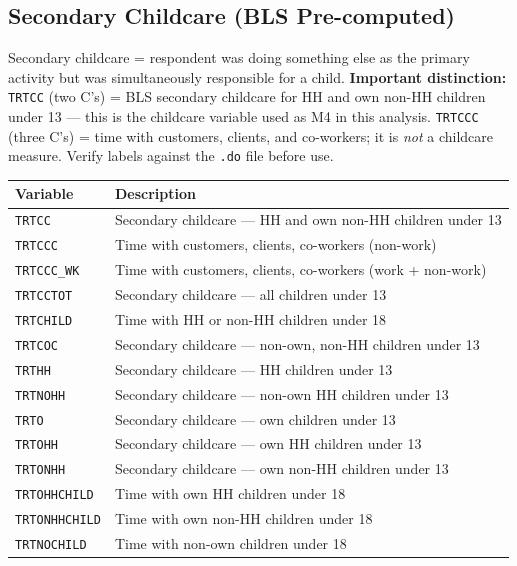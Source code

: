 \documentclass[11pt, a4paper]{article}
\begin{document}
\subsection{Secondary Childcare (BLS Pre-computed)}

\begin{tcolorbox}[notebox]
\small Secondary childcare = respondent was doing something else as the primary
activity but was simultaneously responsible for a child.
\textbf{Important distinction:} \texttt{TRTCC} (two C's) = BLS secondary
childcare for HH and own non-HH children under 13 --- this is the childcare
variable used as M4 in this analysis.
\texttt{TRTCCC} (three C's) = time with customers, clients, and co-workers;
it is \emph{not} a childcare measure. Verify labels against the
\texttt{.do} file before use.
\end{tcolorbox}

\vspace{1mm}
\begin{longtable}{L{3.8cm} L{12cm}}
\toprule \textbf{Variable} & \textbf{Description} \\ \midrule \endhead
\bottomrule \endfoot
\texttt{TRTCC}         & Secondary childcare --- HH and own non-HH children under 13 \\
 \texttt{TRTCCC}        & Time with customers, clients, co-workers (non-work) \\
\texttt{TRTCCC\_WK}    & Time with customers, clients, co-workers (work + non-work) \\
 \texttt{TRTCCTOT}      & Secondary childcare --- all children under 13 \\
\texttt{TRTCHILD}      & Time with HH or non-HH children under 18 \\
 \texttt{TRTCOC}        & Secondary childcare --- non-own, non-HH children under 13 \\
\texttt{TRTHH}         & Secondary childcare --- HH children under 13 \\
 \texttt{TRTNOHH}       & Secondary childcare --- non-own HH children under 13 \\
\texttt{TRTO}          & Secondary childcare --- own children under 13 \\
 \texttt{TRTOHH}        & Secondary childcare --- own HH children under 13 \\
\texttt{TRTONHH}       & Secondary childcare --- own non-HH children under 13 \\
 \texttt{TRTOHHCHILD}   & Time with own HH children under 18 \\
\texttt{TRTONHHCHILD}  & Time with own non-HH children under 18 \\
 \texttt{TRTNOCHILD}    & Time with non-own children under 18 \\
\end{longtable}
\end{document}
